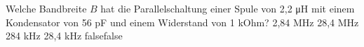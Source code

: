     {Welche Bandbreite $B$ hat die Parallelschaltung einer Spule von 2,2 \si{\micro\henry} mit einem Kondensator von 56 pF und einem Widerstand von 1 kOhm?}
    {2,84 MHz}
    {28,4 MHz}
    {284 kHz}
    {28,4 kHz}
    {false}{false}